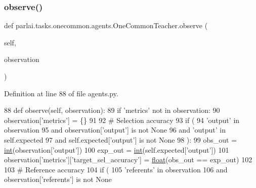 \subsubsection{\texorpdfstring{observe()}{observe()}}
{\footnotesize\ttfamily def parlai.\+tasks.\+onecommon.\+agents.\+One\+Common\+Teacher.\+observe (\begin{DoxyParamCaption}\item[{}]{self,  }\item[{}]{observation }\end{DoxyParamCaption})}



Definition at line 88 of file agents.\+py.


\begin{DoxyCode}
88     \textcolor{keyword}{def }observe(self, observation):
89         \textcolor{keywordflow}{if} \textcolor{stringliteral}{'metrics'} \textcolor{keywordflow}{not} \textcolor{keywordflow}{in} observation:
90             observation[\textcolor{stringliteral}{'metrics'}] = \{\}
91 
92         \textcolor{comment}{# Selection accuracy}
93         \textcolor{keywordflow}{if} (
94             \textcolor{stringliteral}{'output'} \textcolor{keywordflow}{in} observation
95             \textcolor{keywordflow}{and} observation[\textcolor{stringliteral}{'output'}] \textcolor{keywordflow}{is} \textcolor{keywordflow}{not} \textcolor{keywordtype}{None}
96             \textcolor{keywordflow}{and} \textcolor{stringliteral}{'output'} \textcolor{keywordflow}{in} self.expected
97             \textcolor{keywordflow}{and} self.expected[\textcolor{stringliteral}{'output'}] \textcolor{keywordflow}{is} \textcolor{keywordflow}{not} \textcolor{keywordtype}{None}
98         ):
99             obs\_out = \hyperlink{namespacelanguage__model_1_1eval__ppl_a7d12ee00479673c5c8d1f6d01faa272a}{int}(observation[\textcolor{stringliteral}{'output'}])
100             exp\_out = \hyperlink{namespacelanguage__model_1_1eval__ppl_a7d12ee00479673c5c8d1f6d01faa272a}{int}(self.expected[\textcolor{stringliteral}{'output'}])
101             observation[\textcolor{stringliteral}{'metrics'}][\textcolor{stringliteral}{'target\_sel\_accuracy'}] = \hyperlink{namespaceprojects_1_1controllable__dialogue_1_1make__control__dataset_aa2b7207688c641dbc094ab44eca27113}{float}(obs\_out == exp\_out)
102 
103         \textcolor{comment}{# Reference accuracy}
104         \textcolor{keywordflow}{if} (
105             \textcolor{stringliteral}{'referents'} \textcolor{keywordflow}{in} observation
106             \textcolor{keywordflow}{and} observation[\textcolor{stringliteral}{'referents'}] \textcolor{keywordflow}{is} \textcolor{keywordflow}{not} \textcolor{keywordtype}{None}

\end{DoxyCode}

